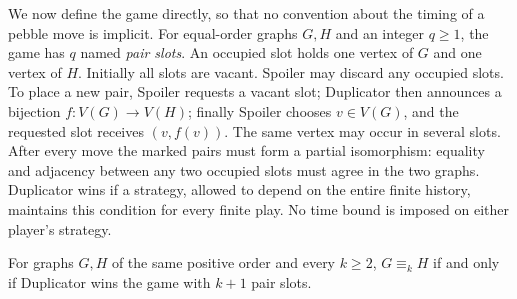 We now define the game directly, so that no convention about the timing of
a pebble move is implicit.  For equal-order graphs $G,H$ and an integer
$q\geq 1$, the game has $q$ named \emph{pair slots}.  An occupied slot holds
one vertex of $G$ and one vertex of $H$.  Initially all slots are vacant.
Spoiler may discard any occupied slots.  To place a new pair, Spoiler
requests a vacant slot; Duplicator then announces a bijection
$f:V(G)\to V(H)$; finally Spoiler chooses $v\in V(G)$, and the requested
slot receives $(v,f(v))$.  The same vertex may occur in several slots.
After every move the marked pairs must form a partial isomorphism: equality
and adjacency between any two occupied slots must agree in the two graphs.
Duplicator wins if a strategy, allowed to depend on the entire finite
history, maintains this condition for every finite play.  No time bound is
imposed on either player's strategy.

\begin{lemma}
\label{lem:wl-game}
For graphs $G,H$ of the same positive order and every $k\geq 2$,
$G\equiv_k H$ if and only if Duplicator wins the game with $k+1$ pair slots.
\end{lemma}

